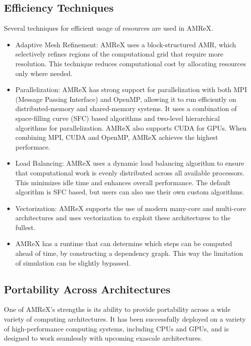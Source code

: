 \documentclass[12pt, a4paper]{scrartcl}
\begin{document}
\subsection{Efficiency Techniques}

Several techniques for efficient usage of resources are used in AMReX.

\begin{itemize}
    \item Adaptive Mesh Refinement: AMReX uses a block-structured AMR, which selectively 
    refines regions of the computational grid that require more resolution.
    This technique reduces computational cost by allocating resources only where needed.
    \item Parallelization: AMReX has strong support for parallelization with both MPI (Message Passing Interface) 
    and OpenMP, allowing it to run efficiently on distributed-memory and shared-memory systems. 
    It uses a combination of space-filling curve (SFC) based algorithms and two-level hierarchical 
    algorithms for parallelization. AMReX also supports CUDA for GPUs. When combining MPI, CUDA and OpenMP, AMReX achieves
    the highest performace.
    \item Load Balancing: AMReX uses a dynamic load balancing algorithm to ensure that computational 
    work is evenly distributed across all available processors. This minimizes idle time and enhances 
    overall performance. The default algorithm is SFC based, but users can also use their own custom algorithms.
    \item Vectorization: AMReX supports the use of modern many-core and multi-core architectures 
    and uses vectorization to exploit these architectures to the fullest.
    \item AMReX has a runtime that can determine which steps can be computed ahead of time, by constructing a dependency graph. This way the limitation of simulation can be slightly bypassed.
\end{itemize}

\subsection{Portability Across Architectures}

One of AMReX's strengths is its ability to provide portability across a wide variety 
of computing architectures. It has been successfully deployed on a variety of high-performance 
computing systems, including CPUs and GPUs, and is designed to work seamlessly 
with upcoming exascale architectures.
\end{document}
